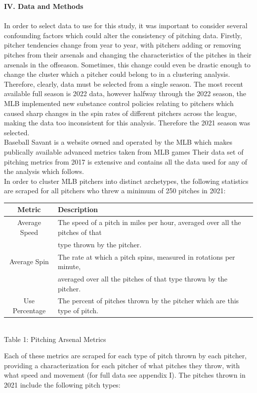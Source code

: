 \documentclass[12 pt]{article}
\begin{document}
\textbf{IV. Data and Methods} \\ \\
\indent In order to select data to use for this study, it was important to consider 
several confounding factors which could alter the consistency of pitching data. 
Firstly, pitcher tendencies change from year to year, with pitchers adding or removing 
pitches from their arsenals and changing the characteristics of the pitches in their 
arsenals in the offseason. Sometimes, this change could even be drastic enough to change the 
cluster which a pitcher could belong to in a clustering analysis. Therefore, clearly, 
data must be selected from a single season. The most recent available full season is 2022 data, however
halfway through the 2022 season, the MLB implemented new substance control policies 
relating to pitchers which caused sharp changes in the spin rates of different pitchers 
across the league, making the data too inconsistent for this analysis. Therefore the 2021 season was selected.
\\ \indent Baseball Savant is a website owned and operated by the MLB which makes 
publically available advanced metrics taken from MLB games Their data set of pitching 
metrics from 2017 is extensive and contains all the data used for any of the analysis which 
follows. 
\\ \indent In order to cluster MLB pitchers into distinct archetypes, the following 
statistics are scraped for all pitchers who threw a minimum of 250 pitches in 2021:
\begin{center}
    \begin{tabular}{||c | l||} 
     \hline
     Metric & Description  \\ [0.5ex] 
     \hline
     Average Speed & The speed of a pitch in miles per hour, averaged over all the
     pitches of that \\ & type thrown by the pitcher. \\
     \hline
     Average Spin & The rate at which a pitch spins, measured in rotations per minute, \\
     & averaged over all the pitches of that type thrown by the pitcher. \\
     \hline
     Use Percentage & The percent of pitches thrown by the pitcher which are this type of pitch. \\
     \hline
    \end{tabular}
    \newline \\ Table 1: Pitching Arsenal Metrics
\end{center}
\indent Each of these metrics are scraped for each type of pitch thrown by each pitcher, 
providing a characterization for each pitcher of what pitches they throw, with what speed 
and movement (for full data see appendix I). The pitches thrown in 2021 include the 
following pitch types: 
\end{document}
